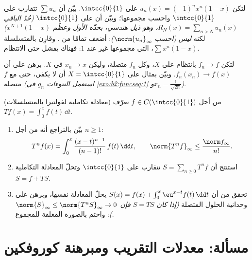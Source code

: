 \begin{exercise}[$\star$]\label{exo:b2:funcseq:10}
لتكن $u_n(x) = (-1)^n x^n(1 - x)$ على $\intcc{0}{1}$. بيّن أن
$\sum u_n$ تتقارب  على $\intcc{0}{1}$ واحسب
مجموعها؛ وبيّن أن  على $\intcc{0}{1}$
\emph{(حُدّ الباقي $R_N(x) = \sum_{n > N} u_n(x)$، وهو ذيل
هندسي، بحدّه الأول وعظّم $x^{N+1}(1-x)$)}
لكنه \emph{ليس}  \emph{(احسب $\norm{u_n}_\infty$)}:
 أضعف تمامًا من .
وقارِن بالمتسلسلة $\sum x^n(1-x)$، التي مجموعها غير  عند
$1$: فهناك يفشل حتى الانتظام.
\end{exercise}

\begin{exercise}[$\star\star$]\label{exo:b2:funcseq:11}
لتكن $f_n \to f$ بانتظام على  $X$، وكل $f_n$
متصلة، وليكن $x_n \to x$ في $X$. برهن على أن $f_n(x_n) \to
f(x)$. وبيّن بمثال على $X = \intcc{0}{1}$ أن 
لا يكفي، حتى مع $f$ متصلة
\emph{(استعمل النتوءات $g_n$ في \cref{exo:b2:funcseq:1} و$x_n =
\frac{1}{\sqrt{2n}}$)}.
\end{exercise}

\begin{exercise}[$\star\star\star$]\label{exo:b2:funcseq:12}
(معادلة تكاملية لفولتيرا بالمتسلسلات) من أجل $f \in
C(\intcc{0}{1})$ نعرّف $Tf(x) = \int_0^x f(t)\,\dd t$.
\begin{enumerate}
  \item بيّن بالتراجع أنه من أجل $n \geq 1$:
        \[
        T^n f(x) = \int_0^x \frac{(x -
        t)^{n-1}}{(n-1)!}\,f(t)\,\dd t,
        \qquad
        \norm{T^n f}_\infty \leq \frac{\norm f_\infty}{n!} .
        \]
  \item استنتج أن $S = \sum_{n\geq0} T^n f$ تتقارب 
        على $\intcc{0}{1}$ وتحلّ المعادلة التكاملية $S = f
        + TS$.
  \item تحقق من أن $S(x) = f(x) + \int_0^x \eu^{x-t}f(t)\,\dd
        t$ يحلّ المعادلة نفسها، وبرهن على وحدانية
        الحلول المتصلة \emph{(إذا كان $S = TS$ فإن
        $\norm{S}_\infty \leq \norm{T^nS}_\infty \to 0$)}:
        واختم بالصورة المغلقة للمجموع.
\end{enumerate}
\end{exercise}

\section{مسألة: معدلات التقريب ومبرهنة كوروفكين}

